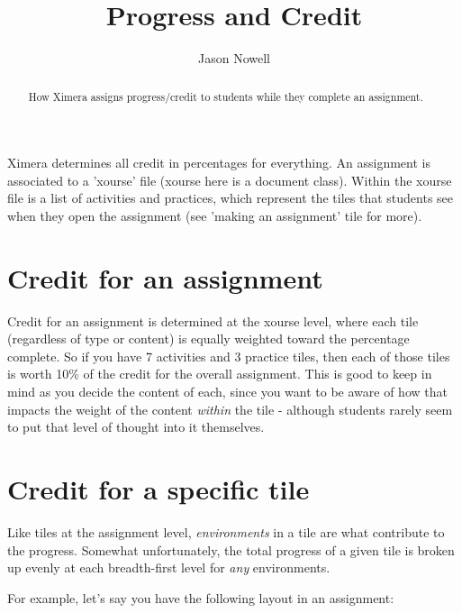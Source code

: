 \documentclass{ximera}
\title{Progress and Credit}
\author{Jason Nowell}
\begin{document}
\begin{abstract}
    How Ximera assigns progress/credit to students while they complete an assignment.
\end{abstract}
\maketitle
 
    Ximera determines all credit in percentages for everything. An assignment is associated to a 'xourse' file (xourse here is a document class). Within the xourse file is a list of activities and practices, which represent the tiles that students see when they open the assignment (see 'making an assignment' tile for more).
     
    \section{Credit for an assignment}
        Credit for an assignment is determined at the xourse level, where each tile (regardless of type or content) is equally weighted toward the percentage complete. So if you have 7 activities and 3 practice tiles, then each of those tiles is worth 10\% of the credit for the overall assignment. This is good to keep in mind as you decide the content of each, since you want to be aware of how that impacts the weight of the content \textit{within} the tile - although students rarely seem to put that level of thought into it themselves.
         
    \section{Credit for a specific tile}
        Like tiles at the assignment level, \textit{environments} in a tile are what contribute to the progress. Somewhat unfortunately, the total progress of a given tile is broken up evenly at each breadth-first level for \textit{any} environments.
         
        For example, let's say you have the following layout in an assignment:
         
\end{document}
